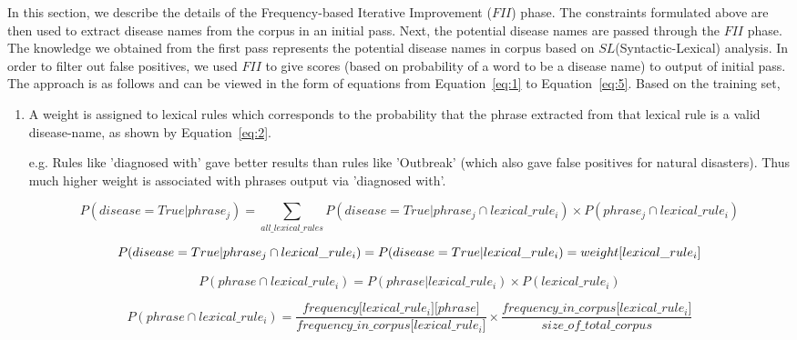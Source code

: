 \documentclass{article}
\begin{document}
In this section, we describe the details of the Frequency-based Iterative Improvement ($FII$) phase. 
The constraints formulated above are then used to extract disease names from the corpus in an initial pass. Next, the potential disease names are passed through the $FII$ phase.
The knowledge we obtained from the first pass represents the potential disease names in corpus based on $SL$(Syntactic-Lexical) analysis. In order to filter out false positives, we used $FII$ to give scores (based on probability of a word to be a disease name) to output of initial pass.
The approach is as follows and can be viewed in the form of equations from Equation~\ref{eq:1} to Equation~\ref{eq:5}.
Based on the training set, 
\begin{enumerate}

\item  A weight is assigned to lexical rules which corresponds to the probability that the phrase extracted from that lexical rule is a valid disease-name, as shown by Equation~\ref{eq:2}.

e.g. Rules like 'diagnosed with' gave better results than rules like 'Outbreak' (which also gave false positives for natural disasters). Thus much higher weight is associated with phrases output via 'diagnosed with'. 

\begin{figure}[t!]

\begin{equation}
P(disease = True | phrase_j) = \sum_{all\_lexical\_rules} P(disease = True | phrase_j \cap lexical\_rule_i) \times P(phrase_j \cap lexical\_rule_i)
\label{eq:1} 
\end{equation}


\begin{equation}
P(disease = True | phrase_j \cap lexical\_rule_i) = P(disease = True | lexical\_rule_i) \\
 = weight \lbrack lexical\_rule_i \rbrack
\label{eq:2} 
\end{equation}

\begin{equation}
P(phrase \cap lexical\_rule_i) = P( phrase | lexical\_rule_i) \times  P(lexical\_rule_i)
\label{eq:3} 
\end{equation}

\begin{equation}
 P(phrase \cap lexical\_rule_i) = \frac{frequency \lbrack lexical\_rule_i] \lbrack phrase \rbrack  } {frequency\_in\_corpus \lbrack lexical\_rule_i \rbrack} \times \frac{frequency\_in\_corpus \lbrack lexical\_rule_i \rbrack} { size\_of\_total\_corpus}
\label{eq:4}
\end{equation}



\end{figure}
\end{enumerate}
\end{document}
